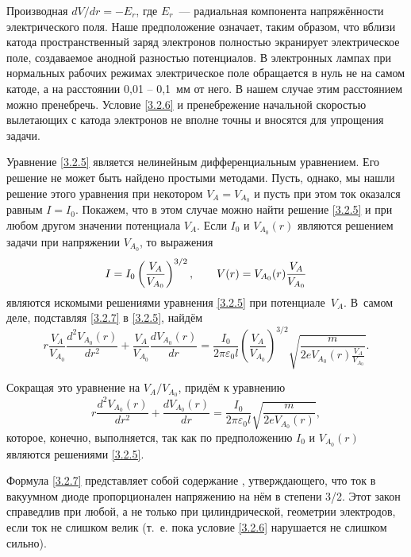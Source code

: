 Производная $dV/dr=-E_r$, где $E_r$~--- радиальная компонента напряжённости электрического поля. Наше предположение
означает, таким образом, что вблизи катода пространственный заряд электронов полностью экранирует электрическое поле, создаваемое анодной разностью потенциалов. В электронных лампах при нормальных рабочих режимах электрическое поле обращается в нуль не на самом катоде, а на расстоянии 0,01 -- 0,1~мм от него. В нашем случае этим расстоянием можно пренебречь. Условие \eqref{3.2.6} и пренебрежение начальной скоростью вылетающих с катода электронов не вполне точны и вносятся для упрощения задачи.

Уравнение \eqref{3.2.5} является нелинейным дифференциальным уравнением. Его решение не может быть найдено простыми методами. Пусть, однако, мы нашли решение этого уравнения при некотором $V_A=V_{A_0}$ и пусть при этом ток оказался равным $I=I_0$. Покажем, что в этом случае можно найти решение \eqref{3.2.5} и при любом другом значении потенциала $V_A$. Если $I_0$ и $V_{A_0}(r)$ являются решением задачи при напряжении $V_{A_0}$, то выражения
\begin{equation}
	I=I_0\left(\frac{V_A}{V_{A_0}}\right)^{3/2},\qquad V(r)=V_{A_0}(r)\frac{V_A}{V_{A_0}}
	\eqmark{3.2.7}
\end{equation}
являются искомыми решениями уравнения \eqref{3.2.5} при потенциале~$V_A$. В~самом деле, подставляя \eqref{3.2.7} в \eqref{3.2.5}, найдём
\begin{equation*}
	r\frac{V_A}{V_{A_0}} \frac{d^2V_{A_0}(r)}{dr^2}+\frac{V_A}{V_{A_0}} \frac{dV_{A_0}(r)}{dr}=
\frac{I_0}{2\pi\varepsilon_0l} \left( \frac{V_A}{V_{A_0}} \right)^{3/2} \sqrt{ \frac{m}{2eV_{A_0}(r )\frac{V_A}{V_{A_0}}}}.
\end{equation*}

Сокращая это уравнение на $V_A/V_{A_0}$, придём к уравнению
\begin{equation*}
	r\frac{d^2V_{A_0}(r)}{dr^2}+ \frac{dV_{A_0}(r)}{dr}=\frac{I_0}{2\pi\varepsilon_0l}\sqrt{\frac{m}{2eV_{A_0}(r)}},
\end{equation*}
которое, конечно, выполняется, так как по предположению $I_0$ и $V_{A_0}(r)$ являются решениями \eqref{3.2.5}.

Формула \eqref{3.2.7} представляет собой содержание , утверждающего, что ток в вакуумном диоде пропорционален напряжению на нём в степени 3/2. Этот закон справедлив при любой, а не только при цилиндрической, геометрии электродов, если ток не слишком велик (т.~е. пока условие \eqref{3.2.6} нарушается не слишком сильно).

